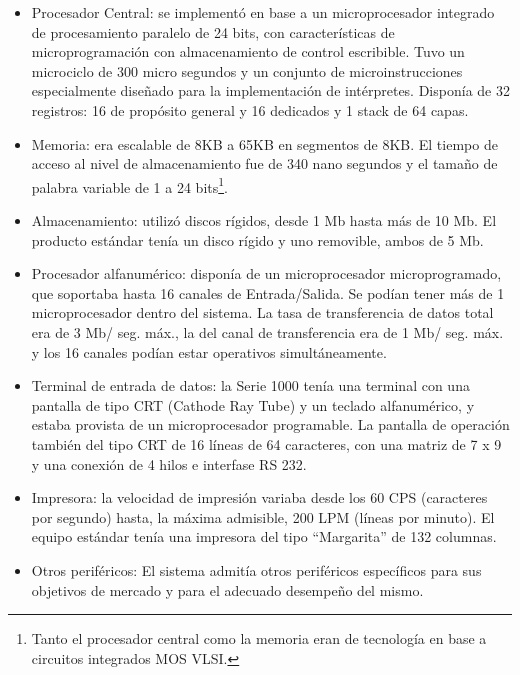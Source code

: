 \documentclass[%
 	final,
%
	notitlepage,
	narroweqnarray,
	inline,
 	twoside,
	]{ieee}
\begin{document}
\begin{itemize}
\item Procesador Central: se implement\'o en base a un microprocesador integrado de procesamiento paralelo de 24 bits, con caracter\'isticas de microprogramaci\'on con almacenamiento de control escribible. Tuvo un microciclo de 300 micro segundos y un conjunto de microinstrucciones especialmente dise\~nado para la implementaci\'on de int\'erpretes. Dispon\'ia de 32 registros: 16 de prop\'osito general y 16 dedicados y 1 stack de 64 capas.\\

\item Memoria: era escalable de 8KB a 65KB en segmentos de 8KB. El tiempo de acceso al nivel de almacenamiento fue de 340 nano segundos y el tama\~no de palabra variable de 1 a 24 bits\footnote{Tanto el procesador central como la memoria eran de tecnolog\'ia en base a circuitos integrados MOS VLSI.}.\\

\item Almacenamiento: utiliz\'o discos r\'igidos, desde 1 Mb hasta m\'as de 10 Mb. El producto est\'andar ten\'ia un disco r\'igido y uno removible, ambos de 5 Mb.\\

\item Procesador alfanum\'erico: dispon\'ia de un microprocesador microprogramado, que soportaba hasta 16 canales de Entrada/Salida. Se pod\'ian tener m\'as de 1 microprocesador dentro del sistema. La tasa de transferencia de datos total era de 3 Mb/ seg. m\'ax., la del canal de transferencia era de 1 Mb/ seg. m\'ax. y los 16 canales pod\'ian estar operativos simult\'aneamente.\\

\item Terminal de entrada de datos: la Serie 1000 ten\'ia una terminal con una pantalla de tipo CRT (Cathode Ray Tube) y un teclado alfanum\'erico, y estaba provista de un microprocesador programable. La pantalla de operaci\'on tambi\'en del tipo CRT de 16 l\'ineas de 64 caracteres, con una matriz de 7 x 9 y una conexi\'on de 4 hilos e interfase RS 232.\\

\item Impresora: la velocidad de impresi\'on variaba desde los 60 CPS (caracteres por segundo) hasta, la m\'axima admisible, 200 LPM (l\'ineas por minuto). El equipo est\'andar ten\'ia una impresora del tipo ``Margarita'' de 132 columnas.\\

\item Otros perif\'ericos: El sistema admit\'ia otros perif\'ericos espec\'ificos para sus objetivos de mercado y para el adecuado desempe\~no del mismo.
\end{itemize}
\end{document}
